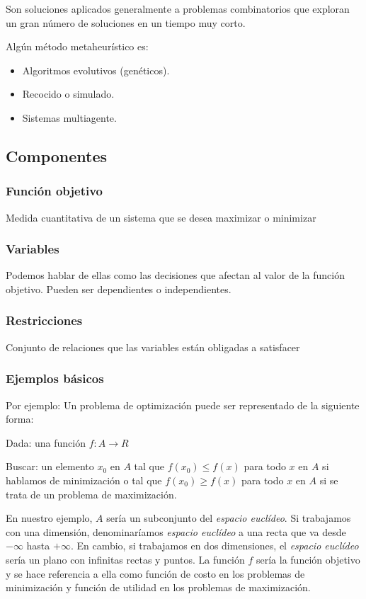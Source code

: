 Son soluciones aplicados generalmente a problemas combinatorios que exploran un gran número de soluciones en un tiempo muy corto.

Algún método metaheurístico es:
\begin{itemize}
	\item Algoritmos evolutivos (genéticos).
	\item Recocido o simulado.
	\item Sistemas multiagente.
\end{itemize}

\subsection{Componentes~\cite{pdf:optimizacion}}

\subsubsection{Función objetivo}
Medida cuantitativa de un sistema que se desea maximizar o minimizar

\subsubsection{Variables}
Podemos hablar de ellas como las decisiones que afectan al valor de la función objetivo. Pueden ser dependientes o independientes.
\subsubsection{Restricciones}
Conjunto de relaciones que las variables están obligadas a satisfacer

\subsubsection{Ejemplos básicos}

Por ejemplo: Un problema de optimización puede ser representado de la siguiente forma:

Dada: una función $f : A \rightarrow R$

Buscar: un elemento $x_{0}$ en $A$ tal que $f(x_{0}) \leq f(x)$ para todo $x$ en $A$ si hablamos de minimización o tal que $f(x_{0}) \geq f(x)$ para todo $x$ en $A$ si se trata de un problema de maximización.

En nuestro ejemplo, $A$ sería un subconjunto del \textit{espacio euclídeo}. Si trabajamos con una dimensión, denominaríamos \textit{espacio euclídeo} a una recta que va desde $-\infty$ hasta $+\infty$. En cambio, si trabajamos en dos dimensiones, el \textit{espacio euclídeo} sería un plano con infinitas rectas y puntos.
La función $f$ sería la función objetivo y se hace referencia a ella como función de costo en los problemas de 
minimización y función de utilidad en los problemas de maximización.

